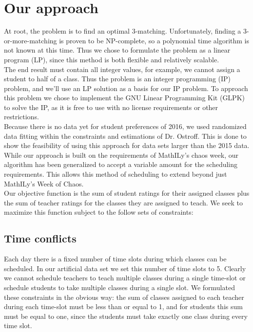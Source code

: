 \documentclass[11pt]{article}
\begin{document}
\section{Our approach}
At root, the problem is to find an optimal 3-matching. Unfortunately, finding a 3-or-more-matching is proven to be NP-complete, so a polynomial time algorithm is not known at this time. Thus we chose to formulate the problem as a linear program (LP), since this method is both flexible and relatively scalable.\\
\indent The end result must contain all integer values, for example, we cannot assign a student to half of a class. Thus the problem is an integer programming (IP) problem, and we'll use an LP solution as a basis for our IP problem. To approach this problem we chose to implement the GNU Linear Programming Kit (GLPK) to solve the IP, as it is free to use with no license requirements or other restrictions.\\
\indent Because there is no data yet for student preferences of 2016, we used randomized data fitting within the constraints and estimations of Dr. Ostroff. This is done to show the feasibility of using this approach for data sets larger than the 2015 data. While our approach is built on the requirements of MathILy's chaos week, our algorithm has been generalized to accept a variable amount for the scheduling requirements. This allows this method of scheduling to extend beyond just MathILy's Week of Chaos.\\
\indent Our objective function is the sum of student ratings for their assigned classes plus the sum of teacher ratings for the classes they are assigned to teach. We seek to maximize this function subject to the follow sets of constraints:\\

\subsection{Time conflicts}
Each day there is a fixed number of time slots during which classes can be scheduled. In our artificial data set we set this number of time slots to 5. Clearly we cannot schedule teachers to teach multiple classes during a single time-slot or schedule students to take multiple classes during a single slot. We formulated these constraints in the obvious way: the sum of classes assigned to each teacher during each time-slot must be less than or equal to 1, and for students this sum must be equal to one, since the students must take exactly one class during every time slot.
\end{document}
